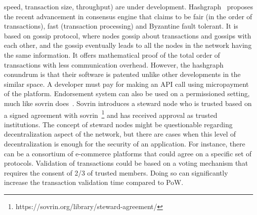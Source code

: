 speed, transaction size, throughput) are under development.
Hashgraph~\cite{baird2016hashgraph} proposes the recent advancement in
consensus engine that claims to be fair (in the order of transactions), fast
(transaction processing) and Byzantine fault tolerant. It is based on gossip
protocol, where nodes gossip about transactions and gossips with each other,
and the gossip eventually leads to all the nodes in the network having the same
information. It offers mathematical proof of the total order of transactions
with less communication overhead. However, the hashgraph conundrum is that
their software is patented unlike other developments in the similar space. A
developer must pay for making an API call using micropayment of the platform.
Endorsement system can also be used on a permissioned setting, much like sovrin
does~\cite{tobin2016inevitable}. Sovrin introduces a steward node who is
trusted based on a signed agreement with
sovrin~\footnote{https://sovrin.org/library/steward-agreement/} and has
received approval as trusted institutions. The concept of steward nodes might
be questionable regarding decentralization aspect of the network, but there are
cases when this level of decentralization is enough for the security of an
application. For instance, there can be a consortium of e-commerce platforms
that could agree on a specific set of protocols.  Validation of transactions
could be based on a voting mechanism that requires the consent of 2/3 of
trusted members. Doing so can significantly increase the transaction validation
time compared to \ac{PoW}.



